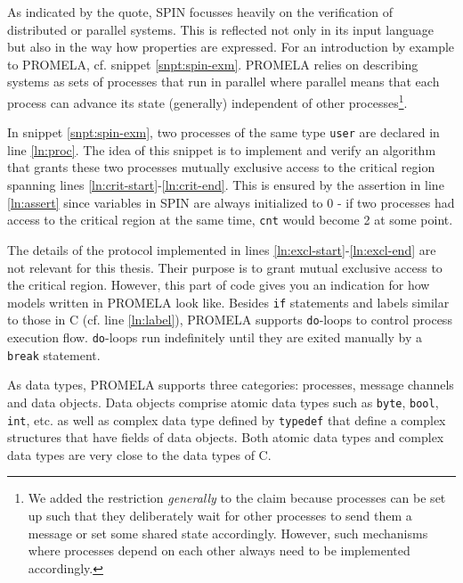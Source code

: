As indicated by the quote, SPIN focusses heavily on the verification of distributed or parallel systems.
This is reflected not only in its input language but also in the way how properties are expressed.
For an introduction by example to PROMELA, cf. snippet \ref{snpt:spin-exm}.
PROMELA relies on describing systems as sets of processes that run in parallel where parallel means that each process can advance its state (generally) independent of other processes\footnote{%
    We added the restriction \textit{generally} to the claim because processes can be set up such that they deliberately wait for other processes to send them a message or set some shared state accordingly.
    However, such mechanisms where processes depend on each other always need to be implemented accordingly.
}.

In snippet \ref{snpt:spin-exm}, two processes of the same type \lstinline{user} are declared in line \ref{ln:proc}.
The idea of this snippet is to implement and verify an algorithm that grants these two processes mutually exclusive access to the critical region spanning lines \ref{ln:crit-start}-\ref{ln:crit-end}.
This is ensured by the assertion in line \ref{ln:assert} since variables in SPIN are always initialized to 0 - if two processes had access to the critical region at the same time, \lstinline{cnt} would become 2 at some point.

The details of the protocol implemented in lines \ref{ln:excl-start}-\ref{ln:excl-end} are not relevant for this thesis.
Their purpose is to grant mutual exclusive access to the critical region.
However, this part of code gives you an indication for how models written in PROMELA look like.
Besides \lstinline{if} statements and labels similar to those in C (cf. line \ref{ln:label}), PROMELA supports \lstinline{do}-loops to control process execution flow.
\lstinline{do}-loops run indefinitely until they are exited manually by a \lstinline{break} statement.

As data types, PROMELA supports three categories: processes, message channels and data objects.
Data objects comprise atomic data types such as \lstinline{byte}, \lstinline{bool}, \lstinline{int}, etc. as well as complex data type defined by \lstinline{typedef} that define a complex structures that have fields of data objects.
Both atomic data types and complex data types are very close to the data types of C.

